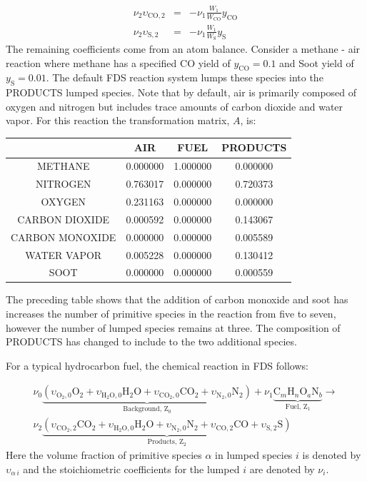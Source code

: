 \begin{eqnarray}\label{eq:yields}
\nu_{2}\upsilon_{\mathrm{CO},2}&=&-\nu_{1}\frac{W_1}{W_{\mathrm{CO}}}y_{\mathrm{CO}} \\
\nu_{2}\upsilon_{\mathrm{S},2}&=&-\nu_{1}\frac{W_1}{W_{\mathrm{S}}}y_{\mathrm{S}}
\end{eqnarray}
The remaining coefficients come from an atom balance. Consider a methane - air reaction where methane has a specified CO yield of $y_{\mathrm{CO}}=0.1$ and Soot yield of $y_{\mathrm{S}}=0.01$. The default FDS reaction system lumps these species into the {\ct PRODUCTS} lumped species. Note that by default, air is primarily composed of oxygen and nitrogen but includes trace amounts of carbon dioxide and water vapor. For this reaction the transformation matrix, $A$, is:

\begin{center}
\begin{tabular}{|c|c|c|c|}
\hline  & {\ct AIR} & {\ct FUEL} & {\ct PRODUCTS} \\ \hline \hline
{\ct METHANE}           & 0.000000 & 1.000000 & 0.000000 \\
{\ct NITROGEN}          & 0.763017 & 0.000000 & 0.720373 \\
{\ct OXYGEN}            & 0.231163 & 0.000000 & 0.000000 \\
{\ct CARBON DIOXIDE}    & 0.000592 & 0.000000 & 0.143067 \\
{\ct CARBON MONOXIDE}   & 0.000000 & 0.000000 & 0.005589 \\ 
{\ct WATER VAPOR}       & 0.005228 & 0.000000 & 0.130412 \\
{\ct SOOT}              & 0.000000 & 0.000000 & 0.000559 \\ \hline
\end{tabular}
\end{center}

The preceding table shows that the addition of carbon monoxide and soot has increases the number of primitive species in the reaction from five to seven, however the number of lumped species remains at three. The composition of {\ct PRODUCTS} has changed to include to the two additional species.

For a typical hydrocarbon fuel, the chemical reaction in FDS follows:

\begin{eqnarray}\label{eq:full_lump}
\nu_{0}\underbrace{(\upsilon_{\mathrm{O}_{2},0}\mathrm{O}_2+\upsilon_{\mathrm{H}_{2}\mathrm{O},0}\mathrm{H}_2\mathrm{O}+\upsilon_{\mathrm{CO}_{2},0}\mathrm{CO}_2+\upsilon_{\mathrm{N}_{2},0}\mathrm{N}_2)}_\text{Background,~Z$_0$}+\nu_{1}\underbrace{\mbox{C}_m\mbox{H}_n\mbox{O}_a\mbox{N}_b}_\text{Fuel,~Z$_1$} \rightarrow \\
\nonumber \nu_{2}\underbrace{(\upsilon_{\mathrm{CO}_{2},2}\mathrm{CO}_2+\upsilon_{\mathrm{H}_{2}\mathrm{O},0}\mathrm{H}_2\mathrm{O}+\upsilon_{\mathrm{N}_{2},0}\mathrm{N}_2+\upsilon_{\mathrm{CO},2}\mathrm{CO}+\upsilon_{\mathrm{S},2}\mathrm{S})}_\text{Products,~Z$_2$}
\end{eqnarray}
Here the volume fraction of primitive species $\alpha$ in lumped species $i$ is denoted by $\upsilon_{\alpha\,i}$ and the stoichiometric coefficients for the lumped $i$ are denoted by $\nu_{i}$.



